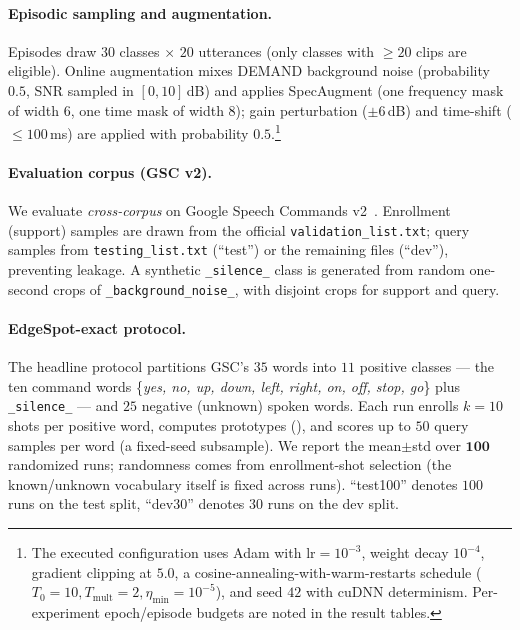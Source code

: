 \documentclass[10pt,twocolumn]{article}
\newcommand{\code}[1]{\texttt{\small #1}}
\begin{document}
\paragraph{Episodic sampling and augmentation.}
Episodes draw $30$ classes $\times$ $20$ utterances (only classes with
$\ge20$ clips are eligible). Online augmentation mixes DEMAND
background noise (probability $0.5$, SNR sampled in $[0,10]$\,dB) and applies
SpecAugment (one frequency mask of width $6$, one time mask of width $8$);
gain perturbation ($\pm6$\,dB) and time-shift ($\le100$\,ms) are applied with
probability $0.5$.\footnote{The executed configuration uses Adam with
$\text{lr}{=}10^{-3}$, weight decay $10^{-4}$, gradient clipping at $5.0$, a
cosine-annealing-with-warm-restarts schedule ($T_0{=}10,T_{\text{mult}}{=}2,
\eta_{\min}{=}10^{-5}$), and seed $42$ with cuDNN determinism. Per-experiment
epoch/episode budgets are noted in the result tables.}

\paragraph{Evaluation corpus (GSC v2).}
We evaluate \emph{cross-corpus} on Google Speech Commands
v2~\cite{warden2018speech}. Enrollment (support) samples are drawn from the
official \code{validation\_list.txt}; query samples from
\code{testing\_list.txt} (``test'') or the remaining files (``dev''), preventing
leakage. A synthetic \code{\_silence\_} class is generated from random one-second
crops of \code{\_background\_noise\_}, with disjoint crops for support and query.

\paragraph{EdgeSpot-exact protocol.}
The headline protocol partitions GSC's $35$ words into $11$ positive classes ---
the ten command words \{\textit{yes, no, up, down, left, right, on, off, stop,
go}\} plus \code{\_silence\_} --- and $25$ negative (unknown) spoken words. Each
run enrolls $k{=}10$ shots per positive word, computes prototypes
(), and scores up to $50$ query samples per word (a fixed-seed
subsample). We report the mean$\pm$std over $\mathbf{100}$ randomized runs;
randomness comes from enrollment-shot selection (the known/unknown vocabulary
itself is fixed across runs). ``test100'' denotes $100$ runs on the test split,
``dev30'' denotes $30$ runs on the dev split.

\end{document}
